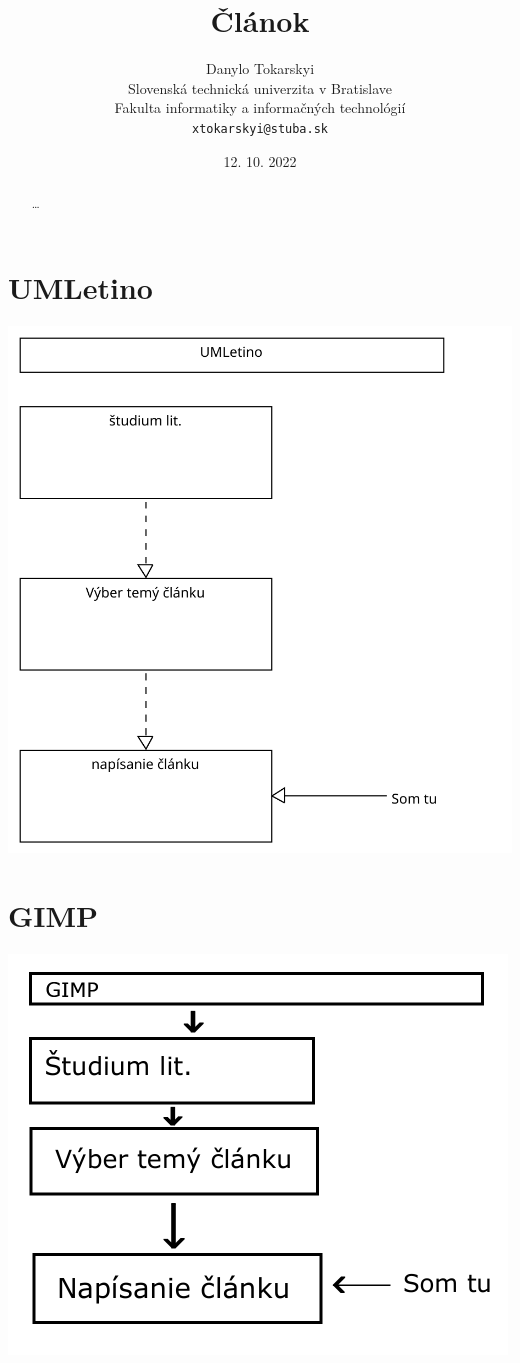 \documentclass[10pt,twoside,slovak,a4paper]{article}
\title{Článok} %
\author{Danylo Tokarskyi\\[2pt]
	{\small Slovenská technická univerzita v Bratislave}\\
	{\small Fakulta informatiky a informačných technológií}\\
	{\small \texttt{xtokarskyi@stuba.sk}}
	}
\date{\small 12. 10. 2022}
\begin{document}
\maketitle

\begin{abstract}
\ldots
\end{abstract}



\section{UMLetino}
\includegraphics[scale=0.75,page=1]{umletino.pdf}

\section{GIMP}
\includegraphics[scale=0.75,page=1]{gimp.pdf}







\nocite{*}
\end{document}
